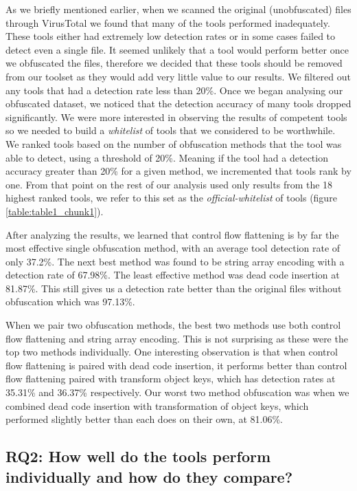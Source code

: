 \documentclass[sigplan,10pt,review, nonacm=true]{acmart}\settopmatter{printfolios=true,printccs=false,printacmref=false}
\begin{document}
As we briefly mentioned earlier, when we scanned the original (unobfuscated) files through VirusTotal we found that many of the tools performed inadequately. These tools either had extremely low detection rates or in some cases failed to detect even a single file. It seemed unlikely that a tool would perform better once we obfuscated the files, therefore we decided that these tools should be removed from our toolset as they would add very little value to our results. We filtered out any tools that had a detection rate less than 20\%. Once we began analysing our obfuscated dataset, we noticed that the detection accuracy of many tools dropped significantly. We were more interested in observing the results of competent tools so we needed to build a \textit{whitelist} of tools that we considered to be worthwhile. We ranked tools based on the number of obfuscation methods that the tool was able to detect, using a threshold of 20\%. Meaning if the tool had a detection accuracy greater than 20\% for a given method, we incremented that tools rank by one. From that point on the rest of our analysis used only results from the 18 highest ranked tools, we refer to this set as the \textit{official-whitelist} of tools (figure \ref{table:table1_chunk1}).

After analyzing the results, we learned that control flow flattening is by far the most effective single obfuscation method, with an average tool detection rate of only 37.2\%. The next best method was found to be string array encoding with a detection rate of 67.98\%. The least effective method was dead code insertion at 81.87\%. This still gives us a detection rate better than the original files without obfuscation which was 97.13\%.

When we pair two obfuscation methods, the best two methods use both control flow flattening and string array encoding. This is not surprising as these were the top two methods individually. One interesting observation is that when control flow flattening is paired with dead code insertion, it performs better than control flow flattening paired with transform object keys, which has detection rates at 35.31\% and 36.37\% respectively. Our worst two method obfuscation was when we combined dead code insertion with transformation of object keys, which performed slightly better than each does on their own, at 81.06\%.

\subsection{RQ2: How well do the tools perform individually and how do they compare?}
\end{document}
